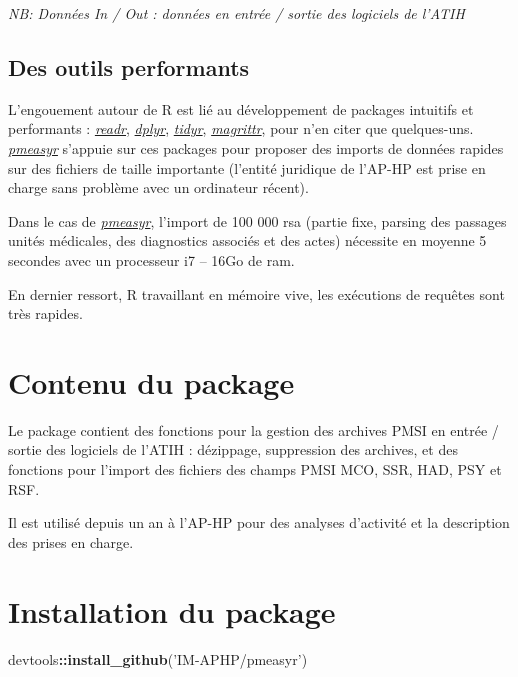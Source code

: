 \documentclass[]{book}
\newenvironment{Shaded}{\begin{snugshade}}{\end{snugshade}}
\newcommand{\KeywordTok}[1]{\textcolor[rgb]{0.13,0.29,0.53}{\textbf{#1}}}
\newcommand{\StringTok}[1]{\textcolor[rgb]{0.31,0.60,0.02}{#1}}
\newcommand{\OperatorTok}[1]{\textcolor[rgb]{0.81,0.36,0.00}{\textbf{#1}}}
\newcommand{\NormalTok}[1]{#1}
\theoremstyle{definition}
\theoremstyle{definition}
\theoremstyle{definition}
\theoremstyle{remark}
\begin{document}
\emph{NB: Données In / Out : données en entrée / sortie des logiciels de
l'ATIH}

\subsection{Des outils performants}\label{des-outils-performants}

L'engouement autour de R est lié au développement de packages intuitifs
et performants : \href{http://readr.tidyverse.org}{\emph{readr}},
\href{https://github.com/hadley/dplyr}{\emph{dplyr}},
\href{http://tidyr.tidyverse.org}{\emph{tidyr}},
\href{https://github.com/tidyverse/magrittr}{\emph{magrittr}}, pour n'en
citer que quelques-uns.
\href{https://github.com/IM-APHP/pmeasyr}{\emph{pmeasyr}} s'appuie sur
ces packages pour proposer des imports de données rapides sur des
fichiers de taille importante (l'entité juridique de l'AP-HP est prise
en charge sans problème avec un ordinateur récent).

Dans le cas de
\href{https://github.com/IM-APHP/pmeasyr}{\emph{pmeasyr}}, l'import de
100 000 rsa (partie fixe, parsing des passages unités médicales, des
diagnostics associés et des actes) nécessite en moyenne 5 secondes avec
un processeur i7 -- 16Go de ram.

En dernier ressort, R travaillant en mémoire vive, les exécutions de
requêtes sont très rapides.

\section{Contenu du package}\label{contenu-du-package}

Le package contient des fonctions pour la gestion des archives PMSI en
entrée / sortie des logiciels de l'ATIH : dézippage, suppression des
archives, et des fonctions pour l'import des fichiers des champs PMSI
MCO, SSR, HAD, PSY et RSF.

Il est utilisé depuis un an à l'AP-HP pour des analyses d'activité et la
description des prises en charge.

\section{Installation du package}\label{installation-du-package}

\begin{Shaded}
\begin{Highlighting}[]
\NormalTok{devtools}\OperatorTok{::}\KeywordTok{install_github}\NormalTok{(}\StringTok{'IM-APHP/pmeasyr'}\NormalTok{)}
\end{Highlighting}
\end{Shaded}
\end{document}
